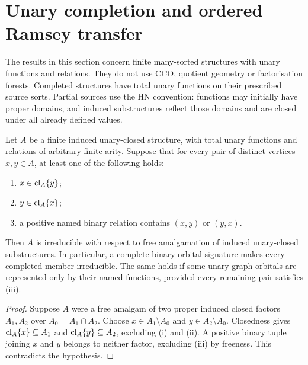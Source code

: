 \section{Unary completion and ordered Ramsey transfer}
\label{sec:unary-hn-transfer}

The results in this section concern finite many-sorted structures with
unary functions and relations. They do not use CCO, quotient geometry or
factorisation forests. Completed structures have total unary functions on
their prescribed source sorts. Partial sources use the HN convention:
functions may initially have proper domains, and induced substructures
reflect those domains and are closed under all already defined values.

\begin{lemma}
\label{lem:typed-unary-binary-irreducibility}
Let $A$ be a finite induced unary-closed structure, with total unary
functions and relations of arbitrary finite arity. Suppose that for every
pair of distinct vertices $x,y\in A$, at least one of the following holds:
\begin{enumerate}[label=(\roman*)]
\item $x\in\operatorname{cl}_A\{y\}$;
\item $y\in\operatorname{cl}_A\{x\}$;
\item a positive named binary relation contains $(x,y)$ or $(y,x)$.
\end{enumerate}
Then $A$ is irreducible with respect to free amalgamation of induced
unary-closed substructures. In particular, a complete binary orbital
signature makes every completed member irreducible. The same holds if
some unary graph orbitals are represented only by their named functions,
provided every remaining pair satisfies (iii).
\end{lemma}
\begin{proof}
Suppose $A$ were a free amalgam of two proper induced closed factors
$A_1,A_2$ over $A_0=A_1\cap A_2$. Choose
$x\in A_1\setminus A_0$ and $y\in A_2\setminus A_0$.
Closedness gives $\operatorname{cl}_A\{x\}\subseteq A_1$ and
$\operatorname{cl}_A\{y\}\subseteq A_2$, excluding (i) and (ii).
A positive binary tuple joining $x$ and $y$ belongs to neither factor,
excluding (iii) by freeness. This contradicts the hypothesis.
\end{proof}

